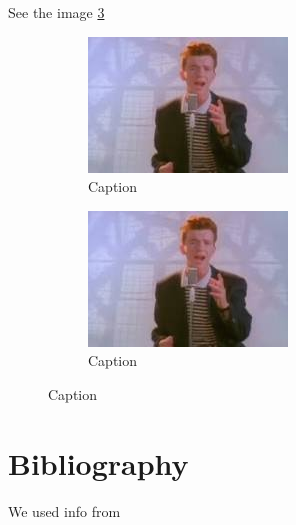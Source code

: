 \documentclass{article}
\begin{document}
See the image \ref{fig:my_label}
\begin{figure}
    \centering
    \begin{subfigure}{\textwidth}
     \includegraphics[width = \linewidth]{rickroll.jpg}
    \caption{Caption}
    \label{fig:my_label}
    \end{subfigure}
   \begin{subfigure}{\textwidth}
     \includegraphics[width = \linewidth]{rickroll.jpg}
    \caption{Caption}
    \label{fig:my_label}
   \end{subfigure}
\end{figure}

\section{Bibliography}
We used info from \cite{fuller1960behavior}
\printbibliography
\end{document}
